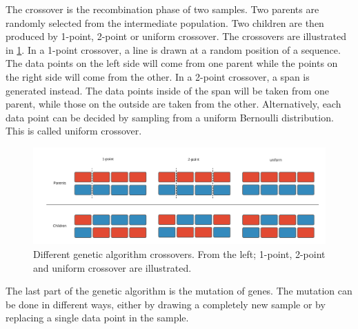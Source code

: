 The crossover is the recombination phase of two samples.
Two parents are randomly selected from the intermediate population.
Two children are then produced by 1-point, 2-point or uniform crossover.
The crossovers are illustrated in \cref{fig:crossover_example}.
In a 1-point crossover, a line is drawn at a random position of a sequence.
The data points on the left side will come from one parent while the points on the right side will come from the other.
In a 2-point crossover, a span is generated instead. The data points inside of the span will be taken from one parent, while those on the outside are taken from the other.
Alternatively, each data point can be decided by sampling from a uniform Bernoulli distribution.
This is called uniform crossover.


\begin{figure}
    \centering
    \includegraphics[width=\linewidth]{chapters/figures/ga_crossover_example.png}
    \caption{Different genetic algorithm crossovers. From the left; 1-point, 2-point and uniform crossover are illustrated.}
    \label{fig:crossover_example}
\end{figure}

The last part of the genetic algorithm is the mutation of genes.
The mutation can be done in different ways, either by drawing a completely new sample or by replacing a single data point in the sample.
